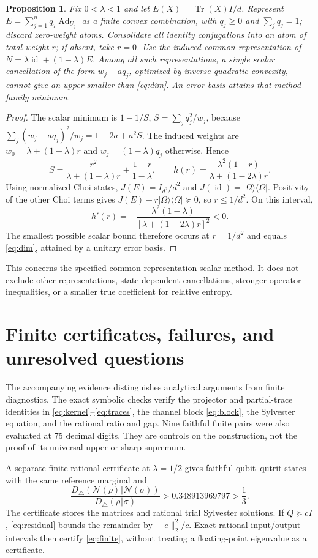 \documentclass[11pt]{article}
\newcommand{\Tr}{\operatorname{Tr}}
\newcommand{\id}{\operatorname{id}}
\newcommand{\Ad}{\operatorname{Ad}}
\newcommand{\N}{\mathcal N}
\newcommand{\Dtri}{D_{\triangle}}
\newtheorem{proposition}[theorem]{Proposition}
\theoremstyle{remark}
\begin{document}
\begin{proposition}\label{prop:barrier}
Fix \(0<\lambda<1\) and let \(E(X)=\Tr(X)I/d\).
Represent \(E=\sum_{j=1}^nq_j\Ad_{U_j}\) as a finite convex combination, with \(q_j\ge0\) and \(\sum_jq_j=1\); discard zero-weight atoms. Consolidate all identity conjugations into an atom of total weight \(r\); if absent, take \(r=0\).
Use the induced common representation of
\(N=\lambda\id+(1-\lambda)E\).
Among all such representations, a single scalar cancellation of the form
\(w_j-aq_j\), optimized by inverse-quadratic convexity, cannot give an upper smaller than \eqref{eq:dim}.
An error basis attains that method-family minimum.
\end{proposition}
\begin{proof}
The scalar minimum is
\(1-1/S\), \(S=\sum_jq_j^2/w_j\), because
\(\sum_j(w_j-aq_j)^2/w_j=1-2a+a^2S\).
The induced weights are \(w_0=\lambda+(1-\lambda)r\) and
\(w_j=(1-\lambda)q_j\) otherwise. Hence
\[
 S=\frac{r^2}{\lambda+(1-\lambda)r}+\frac{1-r}{1-\lambda},
 \qquad
 h(r)=\frac{\lambda^2(1-r)}{\lambda+(1-2\lambda)r}.
\]
Using normalized Choi states, \(J(E)=I_{d^2}/d^2\) and
\(J(\id)=|\Omega\rangle\langle\Omega|\).
Positivity of the other Choi terms gives
\(J(E)-r|\Omega\rangle\langle\Omega|\succeq0\), so \(r\le1/d^2\).
On this interval,
\[
 h'(r)=-\frac{\lambda^2(1-\lambda)}
 {[\lambda+(1-2\lambda)r]^2}<0.
\]
The smallest possible scalar bound therefore occurs at \(r=1/d^2\) and equals \eqref{eq:dim}, attained by a unitary error basis.
\end{proof}
This concerns the specified common-representation scalar method. It does not exclude other representations, state-dependent cancellations, stronger operator inequalities, or a smaller true coefficient for relative entropy.

\section{Finite certificates, failures, and unresolved questions}
The accompanying evidence distinguishes analytical arguments from finite diagnostics.
The exact symbolic checks verify the projector and partial-trace identities in \eqref{eq:kernel}--\eqref{eq:traces}, the channel block \eqref{eq:block}, the Sylvester equation, and the rational ratio and gap.
Nine faithful finite pairs were also evaluated at 75 decimal digits. They are controls on the construction, not the proof of its universal upper or sharp supremum.

A separate finite rational certificate at \(\lambda=1/2\) gives faithful qubit--qutrit states with the same reference marginal and
\begin{equation}\label{eq:finite}
 \frac{\Dtri(\N(\rho)\Vert\N(\sigma))}
 {\Dtri(\rho\Vert\sigma)}>0.348913969797>\frac13.
\end{equation}
The certificate stores the matrices and rational trial Sylvester solutions.
If \(Q\succeq cI\), \eqref{eq:residual} bounds the remainder by
\(\|e\|_2^2/c\).
Exact rational input/output intervals then certify \eqref{eq:finite}, without treating a floating-point eigenvalue as a certificate.
\end{document}
